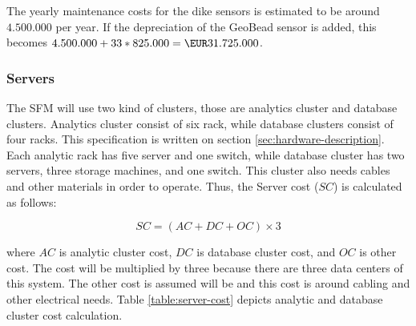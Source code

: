 \newcommand{\installationCosts}{412.500.000}

The yearly maintenance costs for the dike sensors is estimated to be around \EUR$4.500.000$ per year. If the depreciation of the GeoBead sensor is added, this becomes $4.500.000 + 33*825.000 = \EUR31.725.000$. 

\subsubsection{Servers}
The \gls{SFM} will use two kind of clusters, those are analytics cluster and database clusters. Analytics cluster consist of six rack, while database clusters consist of four racks. This specification is written on section \ref{sec:hardware-description}. Each analytic rack has five server and one switch, while database cluster has two servers, three storage machines, and one switch. This cluster also needs cables and other materials in order to operate. Thus, the Server cost ($SC$) is calculated as follows:

\begin{equation*}
SC = (AC + DC + OC) \times 3
\end{equation*}

where $AC$ is analytic cluster cost, $DC$ is database cluster cost, and $OC$ is other cost. The cost will be multiplied by three because there are three data centers of this system. The other cost is assumed will be  and this cost is around cabling and other electrical needs. Table \ref{table:server-cost} depicts analytic and database cluster cost calculation.

